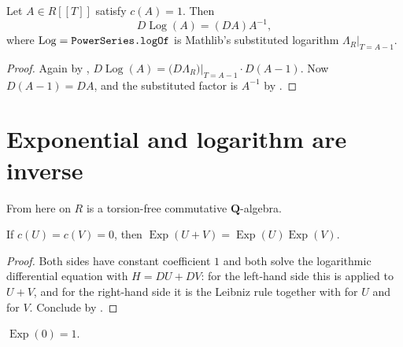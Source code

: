 \begin{lemma}
  \label{lemma:weil-derivative-log}
  \leanok

  Let $A\in R[[T]]$ satisfy $c(A)=1$.  Then
  \[
    D\operatorname{Log}(A)=(DA)A^{-1},
  \]
  where $\operatorname{Log}=\texttt{\detokenize{PowerSeries.logOf}}$ is
  Mathlib's substituted logarithm $\Lambda_R\big|_{T=A-1}$.
\end{lemma}

\begin{proof}
  \leanok
  Again by \texttt{},
  $D\operatorname{Log}(A)=\bigl(D\Lambda_R\bigr)\big|_{T=A-1}\cdot D(A-1)$.
  Now $D(A-1)=DA$, and the substituted factor is $A^{-1}$ by
  .
\end{proof}

\section{Exponential and logarithm are inverse}
\label{sec:weil-exp-log-inverse}

From here on $R$ is a torsion-free commutative $\mathbf Q$-algebra.

\begin{lemma}
  \label{lemma:weil-exp-add}
  \leanok

  If $c(U)=c(V)=0$, then
  $\operatorname{Exp}(U+V)=\operatorname{Exp}(U)\operatorname{Exp}(V)$.
\end{lemma}

\begin{proof}
  \leanok
  Both sides have constant coefficient $1$ and both solve the logarithmic
  differential equation with $H=DU+DV$: for the left-hand side this is
   applied to $U+V$, and for the right-hand
  side it is the Leibniz rule together with
   for $U$ and for $V$.  Conclude by
  .
\end{proof}

\begin{lemma}
  \label{lemma:weil-exp-zero}
  \leanok

  $\operatorname{Exp}(0)=1$.
\end{lemma}


